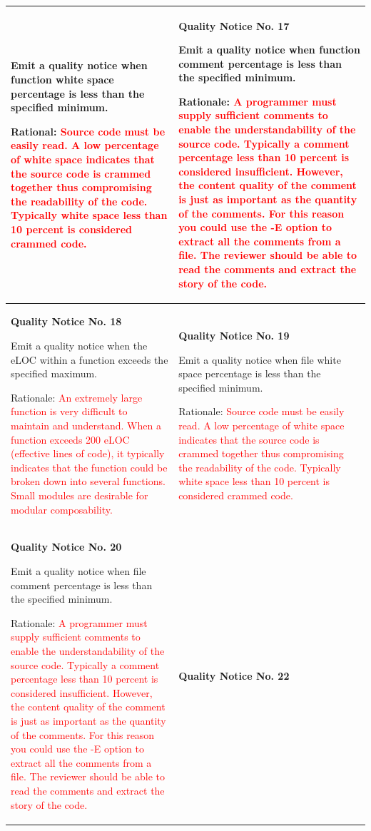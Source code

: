 {\begin{longtable}{||p{}|p{}||}
Emit a quality notice when function white space
percentage is less than the specified minimum.

Rational:  \textcolor{red}{Source code must be easily read.  A low percentage of white space indicates that the source code is crammed together thus compromising the readability of the code.  Typically white space less than 10 percent is considered crammed  code. }
 & \textbf{Quality Notice No. 17}
 
Emit a quality notice when function comment
percentage is less than the specified minimum.

Rationale:  \textcolor{red}{A programmer must supply sufficient comments to enable the understandability of the source code.  Typically a comment percentage less than 10 percent is considered insufficient.  However, the content quality of the comment is just as important as the quantity of the comments.  For this reason you could use the -E option to extract all the comments from a file.  The reviewer should be able to read the comments and extract the story of the code.}
    \\
    \hline \textbf{Quality Notice No. 18}
    
Emit a quality notice when the eLOC within a
function exceeds the specified maximum.

Rationale:  \textcolor{red}{An extremely large function is very difficult to maintain and understand.  When a function exceeds 200 eLOC (effective lines of code), it typically indicates that the function could be broken down into several functions.  Small modules are desirable for modular composability.}
 & \textbf{Quality Notice No. 19}
 
Emit a quality notice when file white space
percentage is less than the specified minimum.

Rationale:  \textcolor{red}{Source code must be easily read.  A low percentage of white space indicates that the source code is crammed together thus compromising the readability of the code.  Typically white space less than 10 percent is considered crammed  code.}

    \\
    \hline \textbf{Quality Notice No. 20}
    
Emit a quality notice when file comment
percentage is less than the specified minimum.

Rationale:  \textcolor{red}{A programmer must supply sufficient comments to enable the understandability of the source code.  Typically a comment percentage less than 10 percent is considered insufficient.  However, the content quality of the comment is just as important as the quantity of the comments.  For this reason you could use the -E option to extract all the comments from a file.  The reviewer should be able to read the comments and extract the story of the code.}
 & \textbf{Quality Notice No. 22}
 

\end{longtable}}
